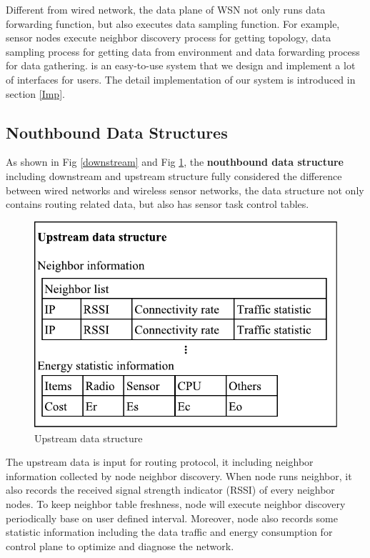 Different from wired network, the data plane of WSN not only runs
data forwarding function, but also executes data sampling function. 
For example,  sensor nodes execute neighbor discovery process for getting topology, 
data sampling process for getting data from environment and data forwarding process
for data gathering. {\sdn} is an easy-to-use system that we design and implement a lot of 
interfaces for users. The detail implementation of our system is introduced in section \ref{Imp}.
\subsection{Nouthbound Data Structures}

As shown in Fig \ref{downstream} and Fig \ref{upstream}, the \textbf{nouthbound data structure} including downstream and upstream structure fully considered the difference between wired networks and wireless sensor networks, the data structure not only contains routing  related data, but also has sensor task control tables.

\begin{figure}[htbp]
	\centering
	\includegraphics[width=.8\columnwidth]{Figure/upstream}
	\caption{Upstream data structure}
	\label{upstream}
\end{figure}

The upstream data is input for routing protocol, it including neighbor information collected by node neighbor discovery. 
When node runs neighbor, it also records the received signal strength indicator (RSSI) of every neighbor nodes. To keep neighbor table freshness, 
node will execute neighbor discovery periodically base on user defined interval.
Moreover, node also records some statistic information including the data traffic and energy consumption for control plane to optimize and diagnose the network.

